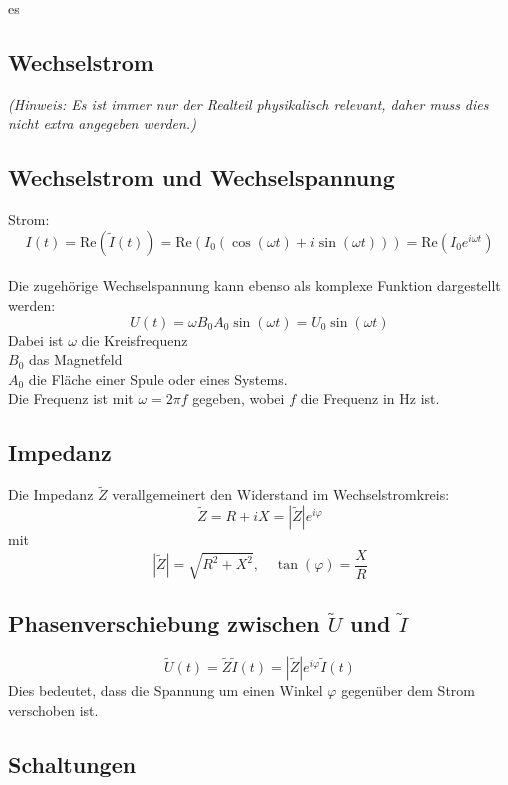 es\documentclass[a4paper, fontsize=8pt, landscape]{scrartcl}
\begin{document}
\begin{multicols*}{4}
\section{Wechselstrom}
\textit{(Hinweis: Es ist immer nur der Realteil physikalisch relevant, daher muss dies nicht extra angegeben werden.)}
\subsection{Wechselstrom und Wechselspannung}
Strom:\\
\[
I(t) = \text{Re}(\tilde{I}(t)) = \text{Re}\left(I_0 (\cos(\omega t) + i \sin(\omega t))\right) = \text{Re}(I_0 e^{i\omega t})
\]\\

Die zugehörige Wechselspannung kann ebenso als komplexe Funktion dargestellt werden:
\[
U(t) = \omega B_0 A_0 \sin(\omega t) = U_0 \sin(\omega t)
\]
Dabei ist $\omega$ die Kreisfrequenz\\
$B_0$ das Magnetfeld\\
$A_0$ die Fläche einer Spule oder eines Systems.\\
Die Frequenz ist mit $\omega = 2\pi f$ gegeben, wobei $f$ die Frequenz in Hz ist.
\subsection{Impedanz}

Die Impedanz $\tilde{Z}$ verallgemeinert den Widerstand im Wechselstromkreis:
\[
\tilde{Z} = R + iX = |\tilde{Z}| e^{i\varphi}
\]
mit
\[
|\tilde{Z}| = \sqrt{R^2 + X^2}, \quad \tan(\varphi) = \frac{X}{R}
\]
\subsection{Phasenverschiebung zwischen $\tilde{U}$ und $\tilde{I}$}

\[
\tilde{U}(t) = \tilde{Z} \tilde{I}(t) = |\tilde{Z}| e^{i\varphi} \tilde{I}(t)
\]
Dies bedeutet, dass die Spannung um einen Winkel $\varphi$ gegenüber dem Strom verschoben ist.
\subsection{Schaltungen}


\end{multicols*}
\end{document}
